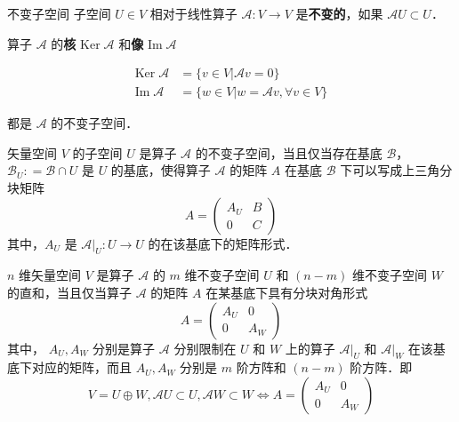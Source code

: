 

\begin{definition}{不变子空间}
子空间 $U\in V$ 相对于线性算子 $\mathcal{A}:V\rightarrow V$ 是\textbf{不变的}，如果 $\mathcal{A}U\subset U$．
\end{definition}

\begin{example}{}
算子 $\mathcal{A}$ 的\textbf{核} $\mathrm{Ker}\;\mathcal A$ 和\textbf{像} $\mathrm{Im}\;\mathcal{A}$

\begin{equation}\label{InvSP_eq3}
\begin{aligned}
\mathrm{Ker}\;\mathcal{A}&=\{ v\in V|\mathcal{A} v= 0\}\\
\mathrm{Im}\;\mathcal{A}&=\{ w\in V| w=\mathcal{A} v,\forall v\in V\}
\end{aligned}
\end{equation}

都是 $\mathcal A$ 的不变子空间．
\end{example}

\begin{theorem}{}
矢量空间 $V$ 的子空间 $U$ 是算子 $\mathcal{A}$ 的不变子空间，当且仅当存在基底 $\mathcal{B}$， $\mathcal{B}_U: = \mathcal{B} \cap U$ 是 $U$ 的基底，使得算子 $\mathcal{A}$ 的矩阵 $A$ 在基底 $\mathcal{B}$ 下可以写成上三角分块矩阵
\begin{equation}
A = \begin{pmatrix}
A_U & B\\
0 & C
\end{pmatrix}
\end{equation}
其中，$A_U$ 是 $\mathcal{A}|_{U}: U \to U$ 的在该基底下的矩阵形式．
\end{theorem}

\begin{theorem}{}\label{InvSP_the1}
$n$ 维矢量空间 $V$ 是算子 $\mathcal{A}$ 的 $m$ 维不变子空间 $U$ 和 $(n-m)$ 维不变子空间 $W$ 的直和，当且仅当算子 $\mathcal{A}$ 的矩阵 $A$ 在某基底下具有分块对角形式
\begin{equation}\label{InvSP_eq1}
A=\begin{pmatrix}
A_U&0\\
0&A_W
\end{pmatrix}
\end{equation}
其中， $A_U,A_W$ 分别是算子 $\mathcal{A}$ 分别限制在 $U$ 和 $W$ 上的算子 $\mathcal{A}|_U$ 和 $\mathcal{A}|_W$ 在该基底下对应的矩阵，而且 $A_U,A_W$ 分别是 $m$ 阶方阵和 $(n-m)$ 阶方阵．即
\begin{equation}
V=U\oplus W,\mathcal{A}U\subset U,\mathcal{A}W\subset W\Leftrightarrow A=\begin{pmatrix}
A_U&0\\
0&A_W
\end{pmatrix}
\end{equation}

\end{theorem}

